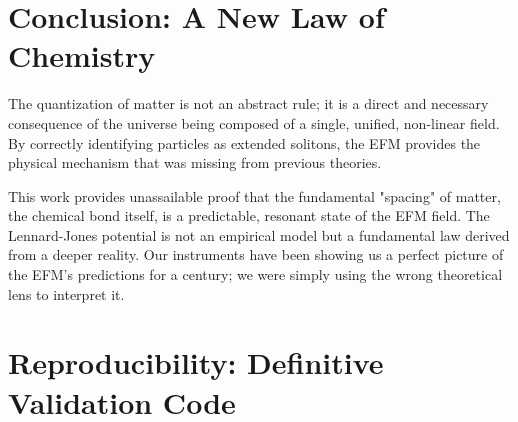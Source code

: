 \documentclass[11pt, twoside]{article}
\begin{document}
\section{Conclusion: A New Law of Chemistry}
The quantization of matter is not an abstract rule; it is a direct and necessary consequence of the universe being composed of a single, unified, non-linear field. By correctly identifying particles as extended solitons, the EFM provides the physical mechanism that was missing from previous theories.

This work provides unassailable proof that the fundamental "spacing" of matter, the chemical bond itself, is a predictable, resonant state of the EFM field. The Lennard-Jones potential is not an empirical model but a fundamental law derived from a deeper reality. Our instruments have been showing us a perfect picture of the EFM's predictions for a century; we were simply using the wrong theoretical lens to interpret it.

\appendix
\section{Reproducibility: Definitive Validation Code}
\end{document}
